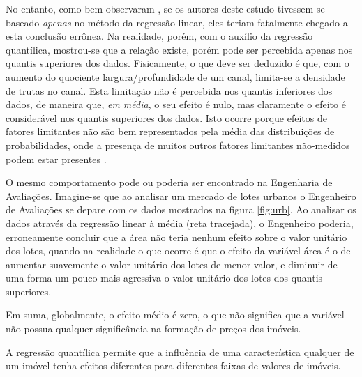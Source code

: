 \documentclass[a4paper, 12pt]{article}
\begin{document}
No entanto, como bem observaram \textcite[412-413]{QReco}, se os autores
deste estudo tivessem se baseado \emph{apenas} no método da regressão
linear, eles teriam fatalmente chegado a esta conclusão errônea. Na
realidade, porém, com o auxílio da regressão quantílica, mostrou-se que
a relação existe, porém pode ser percebida apenas nos quantis superiores
dos dados. Fisicamente, o que deve ser deduzido é que, com o aumento do
quociente largura/profundidade de um canal, limita-se a densidade de
trutas no canal. Esta limitação não é percebida nos quantis inferiores
dos dados, de maneira que, \emph{em média}, o seu efeito é nulo, mas
claramente o efeito é considerável nos quantis superiores dos dados.
Isto ocorre porque efeitos de fatores limitantes não são bem
representados pela média das distribuições de probabilidades, onde a
presença de muitos outros fatores limitantes não-medidos podem estar
presentes \cite[413]{QReco}.

O mesmo comportamento pode ou poderia ser encontrado na Engenharia de
Avaliações. Imagine-se que ao analisar um mercado de lotes urbanos o
Engenheiro de Avaliações se depare com os dados mostrados na figura
\ref{fig:urb}. Ao analisar os dados através da regressão linear à média
(reta tracejada), o Engenheiro poderia, erroneamente concluir que a área
não teria nenhum efeito sobre o valor unitário dos lotes, quando na
realidade o que ocorre é que o efeito da variável área é o de aumentar
suavemente o valor unitário dos lotes de menor valor, e diminuir de uma
forma um pouco mais agressiva o valor unitário dos lotes dos quantis
superiores.

Em suma, globalmente, o efeito médio é zero, o que não significa que a
variável não possua qualquer significância na formação de preços dos
imóveis.

A regressão quantílica permite que a influência de uma característica
qualquer de um imóvel tenha efeitos diferentes para diferentes faixas de
valores de imóveis.
\end{document}
